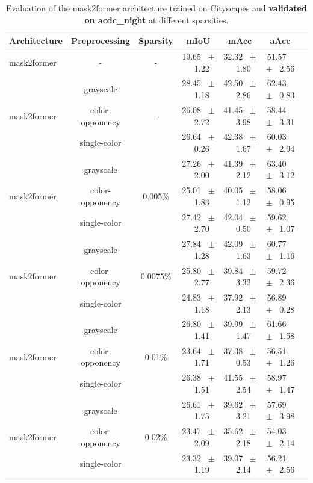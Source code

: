\begin{table}[h]
  \centering
  \caption{Evaluation of the mask2former architecture trained on Cityscapes and \textbf{validated on acdc_night} at different sparsities.}
  \begin{tabular}{@{}lccc ccc@{}}
    \toprule
    Architecture & Preprocessing & Sparsity & mIoU & mAcc & aAcc \\
    \midrule
    mask2former & - & - & 19.65 ~$\pm$~ 1.22 & 32.32 ~$\pm$~ 1.80 & 51.57 ~$\pm$~ 2.56 \\
    \midrule
    \midrule
    \multirow{3}{*}{mask2former} & grayscale & \multirow{3}{*}{-} & 28.45 ~$\pm$~ 1.18 & 42.50 ~$\pm$~ 2.86 & 62.43 ~$\pm$~ 0.83 \\
    & color-opponency & & 26.08 ~$\pm$~ 2.72 & 41.45 ~$\pm$~ 3.98 & 58.44 ~$\pm$~ 3.31 \\
    & single-color & & 26.64 ~$\pm$~ 0.26 & 42.38 ~$\pm$~ 1.67 & 60.03 ~$\pm$~ 2.94 \\
    \midrule
    \multirow{3}{*}{mask2former} & grayscale & \multirow{3}{*}{0.005\%} & 27.26 ~$\pm$~ 2.00 & 41.39 ~$\pm$~ 2.12 & 63.40 ~$\pm$~ 3.12 \\
    & color-opponency & & 25.01 ~$\pm$~ 1.83 & 40.05 ~$\pm$~ 1.12 & 58.06 ~$\pm$~ 0.95 \\
    & single-color & & 27.42 ~$\pm$~ 2.70 & 42.04 ~$\pm$~ 0.50 & 59.62 ~$\pm$~ 1.07 \\
    \midrule
    \multirow{3}{*}{mask2former} & grayscale & \multirow{3}{*}{0.0075\%} & 27.84 ~$\pm$~ 1.28 & 42.09 ~$\pm$~ 1.63 & 60.77 ~$\pm$~ 1.16 \\
    & color-opponency & & 25.80 ~$\pm$~ 2.77 & 39.84 ~$\pm$~ 3.32 & 59.72 ~$\pm$~ 2.36 \\
    & single-color & & 24.83 ~$\pm$~ 1.18 & 37.92 ~$\pm$~ 2.13 & 56.89 ~$\pm$~ 0.28 \\
    \midrule
    \multirow{3}{*}{mask2former} & grayscale & \multirow{3}{*}{0.01\%} & 26.80 ~$\pm$~ 1.41 & 39.99 ~$\pm$~ 1.47 & 61.66 ~$\pm$~ 1.58 \\
    & color-opponency & & 23.64 ~$\pm$~ 1.71 & 37.38 ~$\pm$~ 0.53 & 56.51 ~$\pm$~ 1.26 \\
    & single-color & & 26.38 ~$\pm$~ 1.51 & 41.55 ~$\pm$~ 2.54 & 58.97 ~$\pm$~ 1.47 \\
    \midrule
    \multirow{3}{*}{mask2former} & grayscale & \multirow{3}{*}{0.02\%} & 26.61 ~$\pm$~ 1.75 & 39.62 ~$\pm$~ 3.21 & 57.69 ~$\pm$~ 3.98 \\
    & color-opponency & & 23.47 ~$\pm$~ 2.09 & 35.62 ~$\pm$~ 2.18 & 54.03 ~$\pm$~ 2.14 \\
    & single-color & & 23.32 ~$\pm$~ 1.19 & 39.07 ~$\pm$~ 2.14 & 56.21 ~$\pm$~ 2.56 \\
    \midrule
    \bottomrule
  \end{tabular}
  \label{tab:sparse_mask2former_acdc_night}
\end{table}